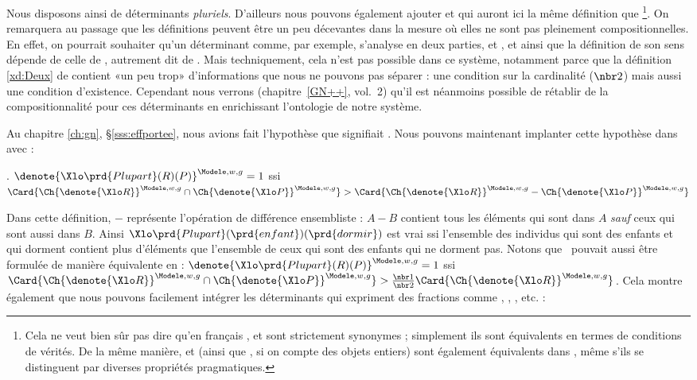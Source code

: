 Nous disposons ainsi de déterminants \emph{pluriels}.  D'ailleurs nous pouvons également ajouter  et  qui auront ici la même définition que \footnote{Cela ne veut bien sûr pas dire qu'en français ,  et  sont strictement synonymes ; simplement ils sont équivalents en termes de conditions de vérités. De la même manière,  et  (ainsi que , si on compte des objets entiers) sont également équivalents dans {\LO}, même s'ils se distinguent par diverses propriétés pragmatiques.}.
On remarquera au passage que les définitions \Last[b-f] peuvent être un peu décevantes dans la mesure où elles ne sont pas pleinement compositionnelles.  En effet, on pourrait souhaiter qu'un déterminant comme, par exemple,  s'analyse en deux parties,  et , et ainsi que la définition de son sens dépende de celle de , autrement dit de .  Mais techniquement, cela n'est pas possible dans ce système, notamment parce que la définition \ref{xd:Deux} de  contient «un peu trop» d'informations que nous ne pouvons pas séparer : une condition sur la cardinalité ($\nbr2$) mais aussi une condition d'existence. 
Cependant nous verrons (chapitre~\ref{GN++}, vol.~2) qu'il est néanmoins possible de rétablir de la compositionnalité pour ces déterminants en enrichissant l'ontologie de notre système. 


Au chapitre \ref{ch:gn}, \S\ref{sss:effportee}, nous avions fait l'hypothèse que  signifiait .  Nous pouvons maintenant implanter cette hypothèse dans {\LO} avec :


\ex.
\(\denote{\Xlo \prd{Plupart}(R)(P)}^{\Modele,w,g}=1\) ssi
\(\Card{\Ch{\denote{\Xlo R}}^{\Modele,w,g} \cap \Ch{\denote{\Xlo P}}^{\Modele,w,g}} >
\Card{\Ch{\denote{\Xlo R}}^{\Modele,w,g} - \Ch{\denote{\Xlo P}}^{\Modele,w,g}}\)

\sloppy
Dans cette définition, $-$ représente l'opération de différence ensembliste : $A - B$ contient tous les éléments qui sont dans $A$ \emph{sauf} ceux qui sont aussi dans $B$.  Ainsi \(\Xlo\prd{Plupart}(\prd{enfant})(\prd{dormir})\) est vrai ssi l'ensemble des individus qui sont des enfants et qui dorment contient plus d'éléments que l'ensemble de ceux qui sont des enfants qui ne dorment pas.
Notons que \Last\ pouvait aussi être formulée de manière équivalente en : \(\denote{\Xlo \prd{Plupart}(R)(P)}^{\Modele,w,g}=1\) ssi
\(\Card{\Ch{\denote{\Xlo R}}^{\Modele,w,g} \cap \Ch{\denote{\Xlo P}}^{\Modele,w,g}} > \frac{\nbr1}{\nbr2}\Card{\Ch{\denote{\Xlo R}}^{\Modele,w,g}}\).
Cela montre également que nous pouvons facilement intégrer les déterminants qui expriment des fractions comme , , , etc. :

